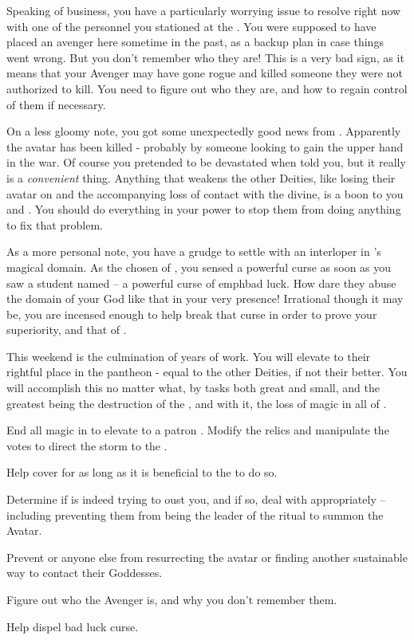 \documentclass[char]{GL2020}
\begin{document}
Speaking of \pGoaties{} business, you have a particularly worrying issue to resolve right now with one of the personnel you stationed at the \pSc{}. You were supposed to have placed an avenger here sometime in the past, as a backup plan in case things went wrong. But you don’t remember who they are! This is a very bad sign, as it means that your Avenger may have gone rogue and killed someone they were not authorized to kill. You need to figure out who they are, and how to regain control of them if necessary.

On a less gloomy note, you got some unexpectedly good news from \cEbbPriest{}. Apparently the \cEbb{} avatar has been killed - probably by someone looking to gain the upper hand in the war. Of course you pretended to be devastated when \cEbbPriest{\they} told you, but it really is a \emph{convenient} thing. Anything that weakens the other Deities, like losing their avatar on \pEarth{} and the accompanying loss of contact with the divine, is a boon to you and \cGenesis{}. You should do everything in your power to stop them from doing anything to fix that problem.

As a more personal note, you have a grudge to settle with an interloper in \cGenesis{}’s magical domain. As the chosen of \cGenesis{}, you sensed a powerful curse as soon as you saw a student named \cInitiate{} -- a powerful curse of emph{bad luck}. How dare they abuse the domain of your God like that in your very presence! Irrational though it may be, you are incensed enough to help \cInitiate{} break that curse in order to prove your superiority, and that of \cGenesis{}.

This weekend is the culmination of years of work. You will elevate \cGenesis{} to their rightful place in the pantheon - equal to the other Deities, if not their better. You will accomplish this no matter what, by tasks both great and small, and the greatest being the destruction of the \pSchool{}, and with it, the loss of magic in all of \pEarth{}.

\begin{itemz}[Goals]
	\item End all magic in \pEarth{} to elevate \cGenesis{} to a patron \cGenesis{\God}. Modify the relics and manipulate the votes to direct the storm to the \pSc{}.
	\item Help \cChupInventor{} cover for \cHeadScientist{} as long as it is beneficial to the \pGoaties{} to do so.
	\item Determine if \cChupSecond{} is indeed trying to oust you, and if so, deal with \cChupSecond{\them} appropriately -- including preventing them from being the leader of the ritual to summon the Avatar.
	\item Prevent \cEbbPriest{} or anyone else from resurrecting the \cEbb{} avatar or finding another sustainable way to contact their Goddesses.
	\item Figure out who the Avenger is, and why you don’t remember them.
\item Help \cInitiate{} dispel \cInitiate{\their} bad luck curse.
\end{itemz}
\end{document}
